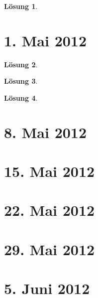 \documentclass[a4paper,12pt]{report}
\theoremstyle{break}
\newtheorem{Loes}{L\"osung}
\theoremstyle{nonumberbreak}
\theoremstyle{nonumberplain}
\begin{document}
\begin{Loes}

\end{Loes}

\newpage
\section{1. Mai 2012}
\setcounter{Aufg}{0}
\setcounter{Loes}{0}

\begin{Loes}

\end{Loes}

\begin{Loes}

\end{Loes}

\begin{Loes}

\end{Loes}

\newpage
\section{8. Mai 2012}
\setcounter{Aufg}{0}
\setcounter{Loes}{0}

\newpage
\section{15. Mai 2012}
\setcounter{Aufg}{0}
\setcounter{Loes}{0}

\newpage
\section{22. Mai 2012}
\setcounter{Aufg}{0}
\setcounter{Loes}{0}

\newpage
\section{29. Mai 2012}
\setcounter{Aufg}{0}
\setcounter{Loes}{0}

\newpage
\section{5. Juni 2012}
\setcounter{Aufg}{0}
\setcounter{Loes}{0}
\end{document}
